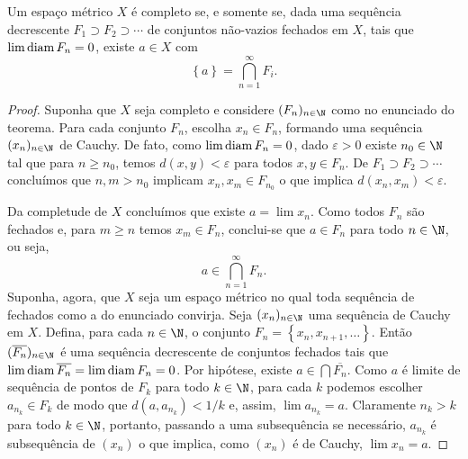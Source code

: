 \begin{prop}
    \label{prop: fechados_encaixados}
    Um espaço métrico \( X \) é completo se, e somente se, dada uma sequência decrescente \( F_{ 1 } \supset F_{ 2 } \supset \cdots \) de conjuntos não-vazios fechados em \( X \), tais que \( \lim \operatorname{diam} F_{ n } = 0 \), existe \( a \in X \) com \[
        \left\{ a \right\} = \bigcap_{ n=1 }^{ \infty } F_{ i }
    .\]
\end{prop}

\begin{proof}
    Suponha que \( X \) seja completo e considere \( ( F_{ n } )_{ n \in \N } \) como no enunciado do teorema.
    Para cada conjunto \( F_{ n } \), escolha \( x_{ n } \in F_{ n } \), formando uma sequência \( ( x_{ n } )_{ n \in \N } \) de Cauchy.
    De fato, como \( \lim \operatorname{diam} F_{ n } = 0 \), dado \( \varepsilon > 0 \) existe \( n_{ 0 } \in \N \) tal que para \( n \geq n_{ 0 } \), temos \( d(x, y) < \varepsilon \) para todos \( x, y \in F_{ n } \).
    De \( F_{ 1 } \supset F_{ 2 } \supset \cdots \) concluímos que \( n, m > n_{ 0 } \) implicam \( x_{ n }, x_{ m } \in F_{ n_{ 0 } } \) o que implica \( d(x_{ n }, x_{ m }) < \varepsilon \).

    Da completude de \( X \) concluímos que existe \( a = \lim x_{ n } \).
    Como todos \( F_{ n } \) são fechados e, para \( m \geq n \) temos \( x_{ m } \in F_{ n } \), conclui-se que \( a \in F_{ n } \) para todo \( n \in \N \), ou seja, \[
        a \in \bigcap_{ n=1 }^{ \infty } F_{ n }
    .\]
    Suponha, agora, que \( X \) seja um espaço métrico no qual toda sequência de fechados como a do enunciado convirja.
    Seja \( ( x_{ n } )_{ n \in \N } \) uma sequência de Cauchy em \( X \).
    Defina, para cada \( n \in \N \), o conjunto \( F_{ n } = \left\{ x_{ n }, x_{ n+1 }, \dots \right\} \).
    Então \( ( \overline{F_{ n }} )_{ n \in \N } \) é uma sequência decrescente de conjuntos fechados tais que \( \lim \operatorname{diam} \overline{F_{ n }} = \lim \operatorname{diam} F_{ n } = 0 \).
    Por hipótese, existe \( a \in \bigcap \overline{F_{ n }} \).
    Como \( a \) é limite de sequência de pontos de \( F_{ k } \) para todo \( k \in \N \), para cada \( k \) podemos escolher \( a_{ n_{ k } } \in F_{ k } \) de modo que \( d(a, a_{ n_{ k } }) < 1/k \) e, assim,  \( \lim a_{ n_{ k } } = a \).
    Claramente \( n_{ k } > k \) para todo \( k \in \N \), portanto, passando a uma subsequência se necessário, \( a_{ n_{ k } } \) é subsequência de \( (x_{ n }) \) o que implica, como \( (x_{ n }) \) é de Cauchy, \( \lim x_{ n } = a \).
\end{proof}

